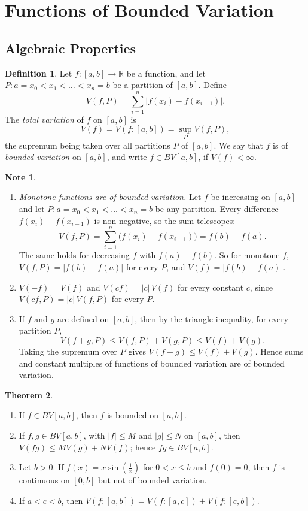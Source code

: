 \documentclass[11pt,a4paper]{article}
\numberwithin{equation}{section}
\theoremstyle{definition}
\newtheorem{thm}{Theorem}[subsection]
\newtheorem{defn}[thm]{Definition}
\newtheorem*{note}{Note}
\begin{document}
\section{Functions of Bounded Variation}

\subsection{Algebraic Properties}

\begin{defn}
Let $f:[a,b]\longrightarrow \mathbb{R}$ be a function, and let $P: a = x_0 < x_1 < \dots < x_n = b$ be a partition of $[a,b]$. Define
$$V(f,P) = \sum^n_{i = 1}|f(x_i)  - f(x_{i - 1})| .$$
The \emph{total variation} of $f$ on $[a,b]$ is
$$V(f) = V(f:[a,b]) = \sup_P V(f,P),$$
the supremum being taken over all partitions $P$ of $[a,b]$. We say that $f$ is of \emph{bounded variation} on $[a,b]$, and write $f\in BV[a,b]$, if $V(f)< \infty$.
\end{defn}

\begin{note}
\begin{enumerate}
\item \emph{Monotone functions are of bounded variation.} Let $f$ be increasing on $[a,b]$ and let $P: a = x_0 < x_1 < \dots < x_n = b$ be any partition. Every difference $f(x_i) - f(x_{i-1})$ is non-negative, so the sum telescopes:
$$V(f,P) = \sum^n_{i=1} \bigl(f(x_i) - f(x_{i -1})\bigr) = f(b) - f(a) .$$
The same holds for decreasing $f$ with $f(a) - f(b)$. So for monotone $f$, $V(f,P) = |f(b) - f(a)|$ for every $P$, and $V(f) = |f(b) - f(a)|$.

\item $V(-f) = V(f)$ and $V(cf) = |c|\,V(f)$ for every constant $c$, since $V(cf,P) = |c|\,V(f,P)$ for every $P$.

\item If $f$ and $g$ are defined on $[a,b]$, then by the triangle inequality, for every partition $P$,
$$V(f + g, P) \leq V(f,P)  + V(g,P) \leq V(f) + V(g).$$
Taking the supremum over $P$ gives $V(f + g) \leq V(f) + V(g)$. Hence sums and constant multiples of functions of bounded variation are of bounded variation.
\end{enumerate}
\end{note}


\begin{thm}\label{thm:bvprops}
\begin{enumerate}
\item[(a)] If $f\in BV[a,b]$, then $f$ is bounded on $[a,b]$.
\item[(b)] If $f, g \in BV[a,b]$, with $|f|\leq M$ and $|g|\leq N$ on $[a,b]$, then $V(fg) \leq M V(g) + N V(f)$; hence $fg\in BV[a,b]$.
\item[(c)] Let $b>0$. If $f(x) = x\sin\left(\frac{1}{x}\right)$ for $0< x\leq b$ and $f(0) = 0$, then $f$ is continuous on $[0,b]$ but not of bounded variation.
\item[(d)] If $a< c< b$, then $V(f: [a,b]) = V(f: [a,c]) + V(f: [c,b])$.
\end{enumerate}
\end{thm}
\end{document}
